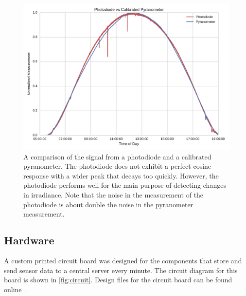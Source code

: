 \begin{figure}[h]
\includegraphics[width=\textwidth]{figs/pdvspy.pdf}
\caption[Comparison of photodiode and pyranometer signals]{A
  comparison of the signal from a photodiode and a calibrated
  pyranometer. The photodiode does not exhibit a perfect cosine
  response with a wider peak that decays too quickly. However, the
  photodiode performs well for the main purpose of detecting changes
  in irradiance. Note that the noise in the measurement of the
  photodiode is about double the noise in the pyranometer measurement.}
\label{fig:pdshape}
\end{figure}

\subsection{Hardware}
\label{sec:senshardware}
A custom printed circuit board was designed for the components that
store and send sensor data to a central server every minute.
The circuit diagram for this board is shown in \cref{fig:circuit}.
Design files for the circuit board can be found online~\cite{sensorrepo}.

